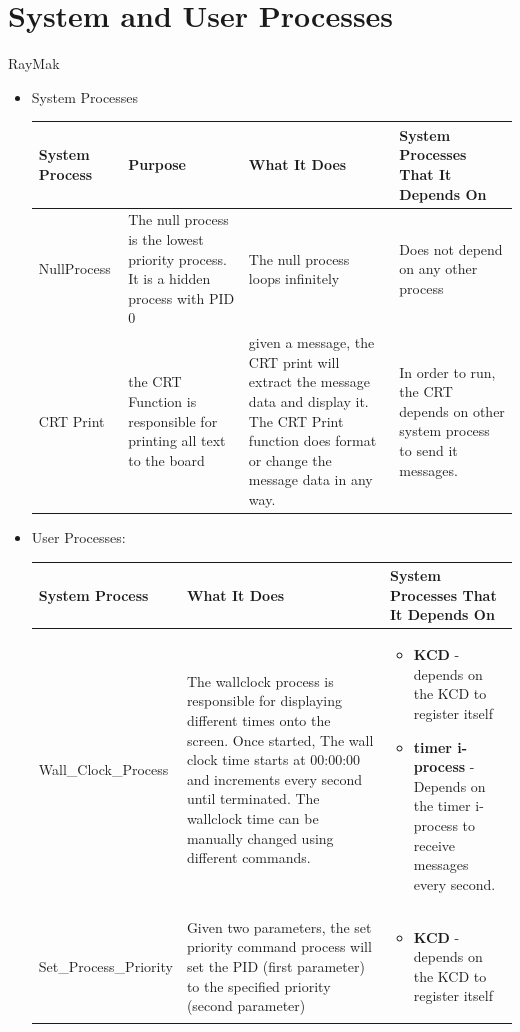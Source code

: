\documentclass[11pt, oneside]{article}
\begin{document}
\section{System and User Processes}
RayMak
\begin{itemize}
\item System Processes \\ \newline
\begin{tabular}{|L{2cm}|L{4cm}|L{4.5cm}|L{4cm}|}\hline
\textbf{System Process} & \textbf{Purpose} & \textbf{What It Does} & \textbf{System Processes That It Depends On} \\ \hline
NullProcess & The null process is the lowest priority process. It is a hidden process with PID 0 & The null process loops infinitely & Does not depend on any other process \\ \hline

CRT Print & the CRT Function is responsible for printing all text to the board & given a message, the CRT print will extract the message data and display it. The CRT Print function does format or change the message data in any way. & In order to run, the CRT depends on other system process to send it messages. \\ \hline
\end{tabular}
\newline
\item User Processes: \\ \newline 
\begin{tabular}{|L{3cm}|L{7cm}|L{5cm}|}\hline
\textbf{System Process} & \textbf{What It Does} & \textbf{System Processes That It Depends On} \\ \hline
Wall\_Clock\_Process & The wallclock process is responsible for displaying different times onto the screen. Once started, The wall clock time starts at 00:00:00 and increments every second until terminated. The wallclock time can be manually changed using different commands. & \begin{itemize}
\item \textbf{KCD} - depends on the KCD to register itself
\item \textbf{timer i-process} - Depends on the timer i-process to receive messages every second.
\end{itemize}\\ \hline
Set\_Process\_Priority & Given two parameters, the set priority command process will set the PID (first parameter) to the specified priority (second parameter) &
\begin{itemize}
\item \textbf{KCD} - depends on the KCD to register itself
\end{itemize} \\ \hline
\end {tabular}

\end{itemize}
\end{document}
